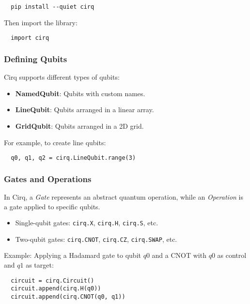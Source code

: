 \begin{verbatim}
  pip install --quiet cirq
\end{verbatim}

Then import the library:

\begin{verbatim}
  import cirq
\end{verbatim}

\subsubsection*{Defining Qubits}
Cirq supports different types of qubits:
\begin{itemize}

  \item \textbf{NamedQubit}: Qubits with custom names.

  \item \textbf{LineQubit}: Qubits arranged in a linear array.

  \item \textbf{GridQubit}: Qubits arranged in a 2D grid.
\end{itemize}

For example, to create line qubits:

\begin{verbatim}
  q0, q1, q2 = cirq.LineQubit.range(3)
\end{verbatim}

\subsubsection*{Gates and Operations}

In Cirq, a \emph{Gate} represents an abstract quantum operation, while an
\emph{Operation} is a gate applied to specific qubits.

\begin{itemize}
  \item Single-qubit gates: \texttt{cirq.X}, \texttt{cirq.H},
    \texttt{cirq.S}, etc.

  \item Two-qubit gates: \texttt{cirq.CNOT}, \texttt{cirq.CZ},
    \texttt{cirq.SWAP}, etc.

\end{itemize}

Example: Applying a Hadamard gate to qubit \(q0\) and a CNOT with \(q0\) as
control and \(q1\) as target:

\begin{verbatim}
  circuit = cirq.Circuit()
  circuit.append(cirq.H(q0))
  circuit.append(cirq.CNOT(q0, q1))
\end{verbatim}

